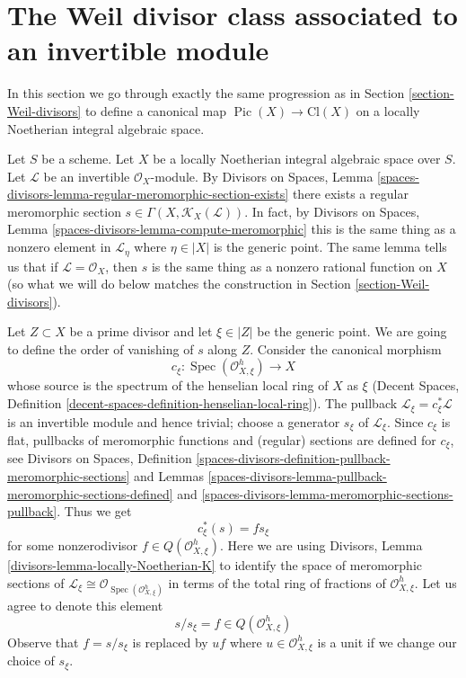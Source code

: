 \documentclass{stacks-project}
\theoremstyle{plain}
\theoremstyle{definition}
\theoremstyle{remark}
\numberwithin{equation}{subsection}
\def\Spec{\mathop{\mathrm{Spec}}}
\def\Pic{\mathop{\mathrm{Pic}}\nolimits}
\begin{document}
\section{The Weil divisor class associated to an invertible module}
\label{section-c1}

\noindent
In this section we go through exactly the same progression as in
Section \ref{section-Weil-divisors} to define a canonical map
$\Pic(X) \to \text{Cl}(X)$
on a locally Noetherian integral algebraic space.

\medskip\noindent
Let $S$ be a scheme. Let $X$ be a locally Noetherian integral algebraic space
over $S$. Let $\mathcal{L}$ be an invertible $\mathcal{O}_X$-module.
By Divisors on Spaces, Lemma
\ref{spaces-divisors-lemma-regular-meromorphic-section-exists}
there exists a regular meromorphic section
$s \in \Gamma(X, \mathcal{K}_X(\mathcal{L}))$.
In fact, by Divisors on Spaces, Lemma
\ref{spaces-divisors-lemma-compute-meromorphic}
this is the same thing as a nonzero element in
$\mathcal{L}_\eta$ where $\eta \in |X|$ is the generic point.
The same lemma tells us that if $\mathcal{L} = \mathcal{O}_X$,
then $s$ is the same thing as a nonzero rational function on $X$
(so what we will do below matches the construction in
Section \ref{section-Weil-divisors}).

\medskip\noindent
Let $Z \subset X$ be a prime divisor and let $\xi \in |Z|$ be the generic point.
We are going to define the order of vanishing of $s$ along $Z$.
Consider the canonical morphism
$$
c_\xi : \Spec(\mathcal{O}_{X, \xi}^h) \longrightarrow X
$$
whose source is the spectrum of the henselian local ring of $X$ as $\xi$
(Decent Spaces, Definition \ref{decent-spaces-definition-henselian-local-ring}).
The pullback $\mathcal{L}_\xi = c_\xi^*\mathcal{L}$
is an invertible module and hence trivial; choose a generator $s_\xi$ of
$\mathcal{L}_\xi$. Since $c_\xi$ is flat, pullbacks of meromorphic functions
and (regular) sections are defined for $c_\xi$, see
Divisors on Spaces, Definition
\ref{spaces-divisors-definition-pullback-meromorphic-sections} and
Lemmas \ref{spaces-divisors-lemma-pullback-meromorphic-sections-defined} and
\ref{spaces-divisors-lemma-meromorphic-sections-pullback}.
Thus we get
$$
c_\xi^*(s) = f s_\xi
$$
for some nonzerodivisor $f \in Q(\mathcal{O}_{X, \xi}^h)$.
Here we are using Divisors, Lemma \ref{divisors-lemma-locally-Noetherian-K}
to identify the space of meromorphic sections of
$\mathcal{L}_\xi \cong \mathcal{O}_{\Spec(\mathcal{O}_{X, \xi}^h)}$
in terms of the total ring of fractions of $\mathcal{O}_{X, \xi}^h$.
Let us agree to denote this element
$$
s/s_\xi = f \in  Q(\mathcal{O}_{X, \xi}^h)
$$
Observe that $f = s/s_\xi$
is replaced by $uf$ where $u \in \mathcal{O}_{X, \xi}^h$
is a unit if we change our choice of $s_\xi$.
\end{document}

